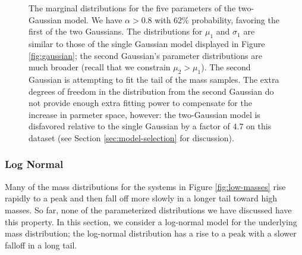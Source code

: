 \documentclass[preprint]{aastex}
\begin{document}
\begin{figure}
  \begin{center}
  \end{center}
  \caption{\label{fig:two-gaussian} The marginal distributions for the
    five parameters of the two-Gaussian model.  We have $\alpha > 0.8$
    with 62\% probability, favoring the first of the two Gaussians.
    The distributions for $\mu_1$ and $\sigma_1$ are similar to those
    of the single Gaussian model displayed in Figure
    \ref{fig:gaussian}; the second Gaussian's parameter distributions
    are much broader (recall that we constrain $\mu_2 > \mu_1$).  The
    second Gaussian is attempting to fit the tail of the mass samples.
    The extra degrees of freedom in the distribution from the second
    Gaussian do not provide enough extra fitting power to compensate
    for the increase in parmeter space, however: the two-Gaussian
    model is disfavored relative to the single Gaussian by a factor of
    $4.7$ on this dataset (see Section \ref{sec:model-selection} for
    discussion).}
\end{figure}

\subsubsection{Log Normal}
\label{sec:log-normal}

Many of the mass distributions for the systems in Figure
\ref{fig:low-masses} rise rapidly to a peak and then fall off more
slowly in a longer tail toward high masses.  So far, none of the
parameterized distributions we have discussed have this property.  In
this section, we consider a log-normal model for the underlying mass
distribution; the log-normal distribution has a rise to a peak with a
slower falloff in a long tail.  
\end{document}
